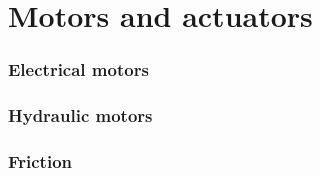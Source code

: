 \part{Motors and actuators}
\section{Electrical motors}

\section{Hydraulic motors}

\section{Friction}